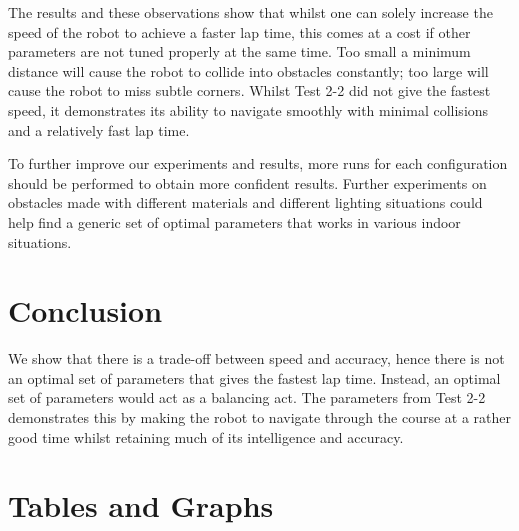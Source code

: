 \documentclass[a4paper,12pt]{article}
\begin{document}
The results and these observations show that whilst one can solely increase the speed of the robot to achieve a faster lap time, this comes at a cost if other parameters are not tuned properly at the same time. Too small a minimum distance will cause the robot to collide into obstacles constantly; too large will cause the robot to miss subtle corners. Whilst Test 2-2 did not give the fastest speed, it demonstrates its ability to navigate smoothly with minimal collisions and a relatively fast lap time.

To further improve our experiments and results, more runs for each configuration should be performed to obtain more confident results. Further experiments on obstacles made with different materials and different lighting situations could help find a generic set of optimal parameters that works in various indoor situations.



\section{Conclusion}
We show that there is a trade-off between speed and accuracy, hence there is not an optimal set of parameters that gives the fastest lap time. Instead, an optimal set of parameters would act as a balancing act. The parameters from Test 2-2 demonstrates this by making the robot to navigate through the course at a rather good time whilst retaining much of its intelligence and accuracy. 

\newpage



\appendix
\section{Tables and Graphs}
\end{document}
